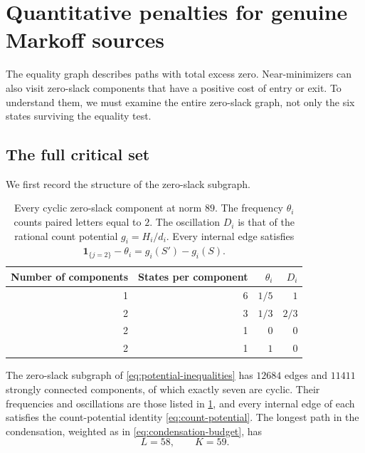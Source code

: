 \section{Quantitative penalties for genuine Markoff sources}
\label{sec:markoff-application}

The equality graph describes paths with total excess zero. Near-minimizers
can also visit zero-slack components that have a positive cost of entry
or exit. To understand them, we must examine the entire zero-slack graph,
not only the six states surviving the equality test.

\subsection{The full critical set}

We first record the structure of the zero-slack subgraph.

\begin{table}[tb]
\centering
\caption{Every cyclic zero-slack component at norm $89$.
The frequency $\theta_i$ counts paired letters equal to $2$.
The oscillation $D_i$ is that of the rational count potential
$g_i=H_i/d_i$. Every internal edge satisfies
$\mathbf1_{\{j=2\}}-\theta_i=g_i(S')-g_i(S)$.}
\label{tab:critical-components}
\begin{tabular}{rrrr}
\toprule
Number of components & States per component & $\theta_i$ & $D_i$\\
\midrule
1 & 6 & $1/5$ & $1$\\
2 & 3 & $1/3$ & $2/3$\\
2 & 1 & $0$ & $0$\\
2 & 1 & $1$ & $0$\\
\bottomrule
\end{tabular}
\end{table}

\begin{proposition}
\label{prop:critical-components}
The zero-slack subgraph of \eqref{eq:potential-inequalities} has $12684$
edges and $11411$ strongly connected components, of which exactly seven
are cyclic. Their frequencies and oscillations are those listed in
\cref{tab:critical-components}, and every internal edge of each satisfies
the count-potential identity \eqref{eq:count-potential}. The longest path
in the condensation, weighted as in \eqref{eq:condensation-budget}, has
\begin{equation}
 L=58,\qquad K=59.
 \label{eq:axis-constants}
\end{equation}
\end{proposition}

